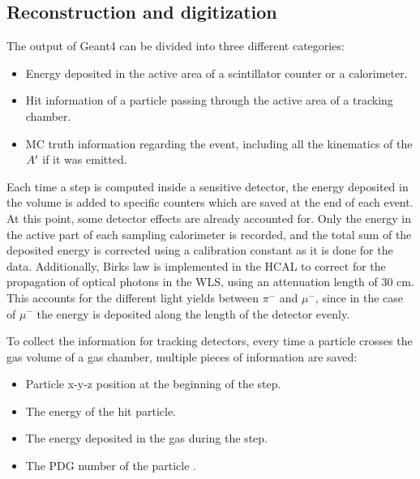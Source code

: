 \subsection{Reconstruction and digitization}
\label{ch3:sec:geant4-digitization}

The output of Geant4 can be divided into three different categories:

\begin{itemize}
\item Energy deposited in the active area of a scintillator counter or a calorimeter.
\item Hit information of a particle passing through the active area of a tracking chamber.
\item MC truth information regarding the event, including all the kinematics of the $A'$ if it was emitted.
\end{itemize}

Each time a step is computed inside a sensitive detector, the energy deposited in the volume is added to specific counters which are saved at the end of each event. At this point, some detector effects are already accounted for. Only the energy in the active part of each sampling calorimeter is recorded, and the total sum of the deposited energy is corrected using a calibration constant as it is done for the data. Additionally, Birks law \cite{NYIBULE2014141} is implemented in the HCAL to correct for the propagation of optical photons in the WLS, using an attenuation length of 30 \si{\centi\meter}. This accounts for the different light yields between $\pi^-$ and $\mu^-$, since in the case of $\mu^-$ the energy is deposited along the length of the detector evenly.

To collect the information for tracking detectors, every time a particle crosses the gas volume of a gas chamber, multiple pieces of information are saved:

\begin{itemize}
\item Particle x-y-z position at the beginning of the step.
\item The energy of the hit particle.  
\item The energy deposited in the gas during the step.
\item The PDG number of the particle \cite{particle-numbering-scheme}.
\end{itemize}

